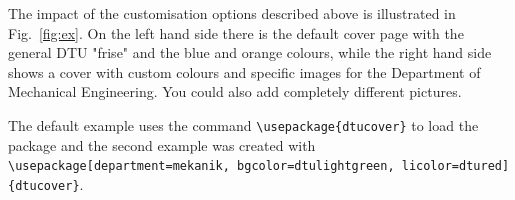 \documentclass[b5paper]{article}
\begin{document}
The impact of the customisation options described above is illustrated in Fig.~\ref{fig:ex}. On the left hand side there is the 
default cover page with the general DTU "frise" and the blue and orange colours, while the right hand side shows a cover with 
custom colours and specific images for the Department of Mechanical Engineering. You could also add completely different pictures.

The default example uses the command \texttt{\textbackslash usepackage\{dtucover\}} to load the package and the 
second example was created with \texttt{\textbackslash usepackage[department=mekanik, bgcolor=dtulightgreen, licolor=dtured]\{dtucover\}}.  
\end{document}
